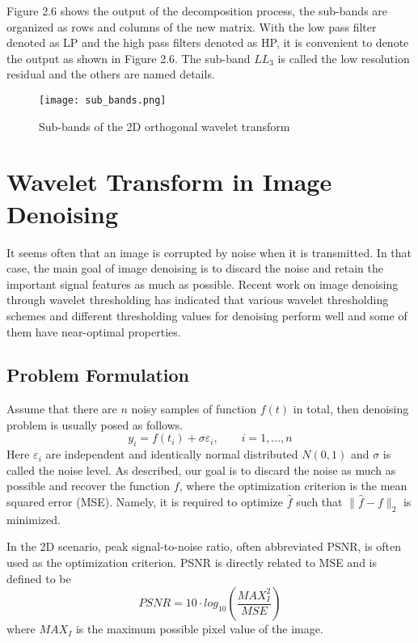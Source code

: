 Figure 2.6 shows the output of the decomposition process, the sub-bands are organized as rows and columns of the new matrix. With the low pass filter denoted as LP and the high pass filters denoted as HP, it is convenient to denote the output as shown in Figure 2.6. The sub-band $LL_3$ is called the low resolution residual and the others are named details.

\begin{figure}[htb]
\centering
\texttt{[image: sub\_bands.png]}
\caption{Sub-bands of the 2D orthogonal wavelet transform}
\end{figure}


\section{Wavelet Transform in Image Denoising}

It seems often that an image is corrupted by noise when it is transmitted. In that case, the main goal of image denoising is to discard the noise and retain the important signal features as much as possible. Recent work on image denoising through wavelet thresholding has indicated that various wavelet thresholding schemes and different thresholding values for denoising perform well and some of them have near-optimal properties.


\subsection{Problem Formulation}
Assume that there are $n$ noisy samples of function $f(t)$ in total, then denoising problem is usually posed as follows. 
\begin{equation} y_i = f(t_i) + \sigma\varepsilon_i, \qquad i=1,...,n  \end{equation}
Here $\varepsilon_i$ are independent and identically normal distributed $N(0,1)$ and $\sigma$ is called the noise level. As described, our goal is to discard the noise as much as possible and recover the function $f$, where the optimization criterion is the mean squared error (MSE). Namely, it is required to optimize $\hat{f}$ such that $\|\hat f - f\|_2 $ is minimized.

In the 2D scenario, peak signal-to-noise ratio, often abbreviated PSNR, is often used as the optimization criterion. PSNR is directly related to MSE and is defined to be
\begin{equation} PSNR = 10\cdot log_{10}(\frac{MAX^2_I}{MSE})  \end{equation}
where $MAX_I$ is the maximum possible pixel value of the image.


